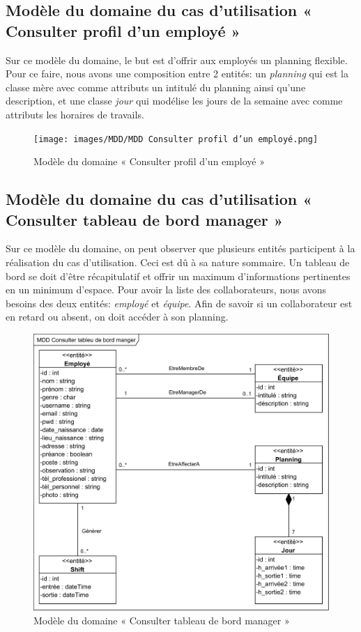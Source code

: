 \subsection*{Modèle du domaine du cas d'utilisation « Consulter profil d'un employé »}
Sur ce modèle du domaine, le but est d’offrir aux employés un planning 
flexible. Pour ce faire, nous avons une composition entre 2 entités: un
\emph{planning} qui est la classe mère avec comme attributs un intitulé du
planning ainsi qu’une description, et une classe \emph{jour} qui modélise les
jours de la semaine avec comme attributs les horaires de travails.

\clearpage

\begin{figure}[h!]
    \centering
    \texttt{[image: images/MDD/MDD Consulter profil d'un employé.png]}
    \caption{Modèle du domaine « Consulter profil d'un employé »}
    \label{fig18}
\end{figure}
            
\subsection*{Modèle du domaine du cas d'utilisation « Consulter tableau de bord manager »}
Sur ce modèle du domaine, on peut observer que plusieurs entités participent à
la réalisation du cas d’utilisation. Ceci est dû à sa nature sommaire. Un
tableau de bord se doit d’être récapitulatif et offrir un maximum d’informations
pertinentes en un minimum d’espace. Pour avoir la liste des collaborateurs, nous
avons besoins des deux entités: \emph{employé} et \emph{équipe}. Afin de savoir
si un collaborateur est en retard ou absent, on doit accéder à son planning. 

\begin{figure}[h!]
    \centering
    \includegraphics[scale=1.06]{images/MDD/MDD Consulter tableu de bord manger.png}
    \caption{Modèle du domaine « Consulter tableau de bord manager »}
    \label{fig19}
\end{figure}
            
